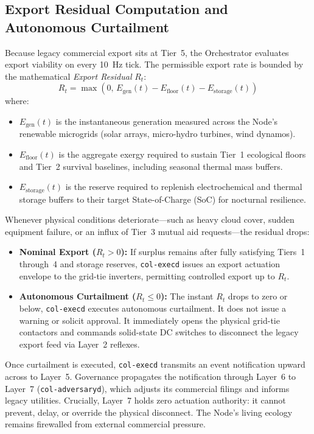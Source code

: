 \subsection{Export Residual Computation and Autonomous Curtailment}

Because legacy commercial export sits at Tier~5, the Orchestrator evaluates export viability on every 10~Hz tick. The permissible export rate is bounded by the mathematical \textit{Export Residual} $R_t$:
\begin{equation}
R_t = \max\left(0, \, E_{\mathrm{gen}}(t) - E_{\mathrm{floor}}(t) - E_{\mathrm{storage}}(t)\right)
\label{eq:ch5_rt_residual}
\end{equation}
where:
\begin{itemize}
  \item $E_{\mathrm{gen}}(t)$ is the instantaneous generation measured across the Node's renewable microgrids (solar arrays, micro-hydro turbines, wind dynamos).
  \item $E_{\mathrm{floor}}(t)$ is the aggregate exergy required to sustain Tier~1 ecological floors and Tier~2 survival baselines, including seasonal thermal mass buffers.
  \item $E_{\mathrm{storage}}(t)$ is the reserve required to replenish electrochemical and thermal storage buffers to their target State-of-Charge (SoC) for nocturnal resilience.
\end{itemize}

Whenever physical conditions deteriorate—such as heavy cloud cover, sudden equipment failure, or an influx of Tier~3 mutual aid requests—the residual drops:
\begin{itemize}
  \item \textbf{Nominal Export ($R_t > 0$):} If surplus remains after fully satisfying Tiers~1 through~4 and storage reserves, \texttt{col-execd} issues an export actuation envelope to the grid-tie inverters, permitting controlled export up to $R_t$.
  \item \textbf{Autonomous Curtailment ($R_t \le 0$):} The instant $R_t$ drops to zero or below, \texttt{col-execd} executes autonomous curtailment. It does not issue a warning or solicit approval. It immediately opens the physical grid-tie contactors and commands solid-state DC switches to disconnect the legacy export feed via Layer~2 reflexes.
\end{itemize}

Once curtailment is executed, \texttt{col-execd} transmits an event notification upward across  to Layer~5. Governance propagates the notification through Layer~6 to Layer~7 (\texttt{col-adversaryd}), which adjusts its commercial filings and informs legacy utilities. Crucially, Layer~7 holds zero actuation authority: it cannot prevent, delay, or override the physical disconnect. The Node's living ecology remains firewalled from external commercial pressure.


